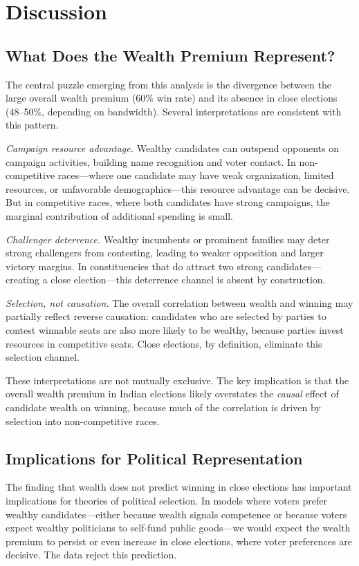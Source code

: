 \documentclass[12pt]{article}
\begin{document}
\section{Discussion}

\subsection{What Does the Wealth Premium Represent?}

The central puzzle emerging from this analysis is the divergence between the large overall wealth premium (60\% win rate) and its absence in close elections (48--50\%, depending on bandwidth). Several interpretations are consistent with this pattern.

\textit{Campaign resource advantage.} Wealthy candidates can outspend opponents on campaign activities, building name recognition and voter contact. In non-competitive races---where one candidate may have weak organization, limited resources, or unfavorable demographics---this resource advantage can be decisive. But in competitive races, where both candidates have strong campaigns, the marginal contribution of additional spending is small.

\textit{Challenger deterrence.} Wealthy incumbents or prominent families may deter strong challengers from contesting, leading to weaker opposition and larger victory margins. In constituencies that do attract two strong candidates---creating a close election---this deterrence channel is absent by construction.

\textit{Selection, not causation.} The overall correlation between wealth and winning may partially reflect reverse causation: candidates who are selected by parties to contest winnable seats are also more likely to be wealthy, because parties invest resources in competitive seats. Close elections, by definition, eliminate this selection channel.

These interpretations are not mutually exclusive. The key implication is that the overall wealth premium in Indian elections likely overstates the \textit{causal} effect of candidate wealth on winning, because much of the correlation is driven by selection into non-competitive races.

\subsection{Implications for Political Representation}

The finding that wealth does not predict winning in close elections has important implications for theories of political selection. In models where voters prefer wealthy candidates---either because wealth signals competence or because voters expect wealthy politicians to self-fund public goods---we would expect the wealth premium to persist or even increase in close elections, where voter preferences are decisive. The data reject this prediction.
\end{document}
